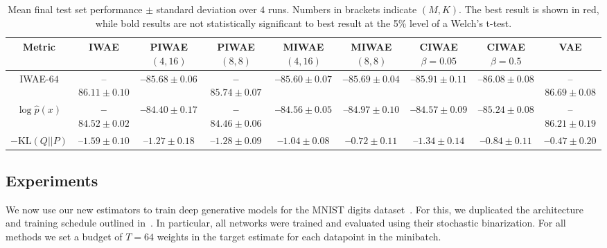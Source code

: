 \begin{table}[t!]                        
	\centering    
	\scriptsize             
	\setlength\tabcolsep{2.5pt}	  
	\renewcommand{\arraystretch}{1.2}          
	\caption{Mean final test set performance $\pm$ standard deviation over $4$ runs. Numbers in brackets indicate $(M,K)$.
		The best result is shown in red, while bold results are not
		statistically significant to best result at the 5\% level of a Welch's t-test. \vspace{-8pt} \label{table:final-pef}}                    
	\begin{tabular}{|c|cccccccc|}                    
		\hline                                                       
		Metric & \gls{IWAE} & \gls{PIWAE} $(4,16)$ & \gls{PIWAE} $(8,8)$ & 
		\gls{MIWAE} $(4,16)$ & \gls{MIWAE} $(8,8)$ & \gls{CIWAE} $\beta=0.05$ & \gls{CIWAE} $\beta=0.5$ & \gls{VAE}     \\
		\hline    
		\gls{IWAE}-$64$ 
		& --$86.11\pm 0.10$ 
		& {\bf--}$\mathbf{85.68\pm 0.06}$ & {\bf--}$\mathbf{85.74\pm 0.07}$ 
		& {\color{red} \bf --$\mathbf{85.60\pm 0.07}$} & {\bf--}$\mathbf{85.69\pm 0.04}$ 
		& --$85.91\pm 0.11$ & --$86.08\pm 0.08$  
		& --$86.69\pm 0.08$ \\ 
		$\log \hat{p}(x)$ 
		& {\bf--}$\mathbf{84.52\pm 0.02}$  
		& {\color{red} \bf --$\mathbf{84.40\pm 0.17}$} 	& {\bf--}$\mathbf{84.46\pm 0.06}$ 
		& {\bf--}$\mathbf{84.56\pm 0.05}$ & --$84.97\pm 0.10$	 
		& 	{\bf--}$\mathbf{84.57\pm 0.09}$ & --$85.24\pm 0.08$  
		& --$86.21\pm 0.19$ \\ 
		$-\mathrm{KL}(Q|| P)$ 
		& --$1.59\pm 0.10$ 
		& --$1.27\pm 0.18$ & --$1.28\pm 0.09$ 
		& {\bf--}$\mathbf{1.04\pm 0.08}$ & {\bf--}$\mathbf{0.72\pm 0.11}$  
		& --$1.34\pm 0.14$ & {\bf--}$\mathbf{0.84\pm 0.11}$ 
		& {\color{red} \bf --$\mathbf{0.47\pm 0.20}$} \\ 
		\hline                                
	\end{tabular}                 
	\vspace{-12pt}                                           
\end{table} 

\subsection{Experiments}
\label{sec:exp-algs}

We now use our new estimators to train deep generative models for the MNIST digits 
dataset~\citep{Lecun1998gradient}.  For this, we duplicated the 
architecture and
training schedule outlined in~\citet{Burda2016importance}. In particular, all networks were trained and evaluated using their
 stochastic binarization.
For all methods we set a budget of $T=64$ weights in the target estimate
for each datapoint in the minibatch.  


